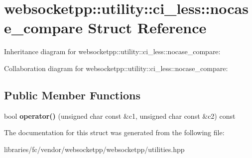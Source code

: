 \hypertarget{structwebsocketpp_1_1utility_1_1ci__less_1_1nocase__compare}{}\section{websocketpp\+:\+:utility\+:\+:ci\+\_\+less\+:\+:nocase\+\_\+compare Struct Reference}
\label{structwebsocketpp_1_1utility_1_1ci__less_1_1nocase__compare}


Inheritance diagram for websocketpp\+:\+:utility\+:\+:ci\+\_\+less\+:\+:nocase\+\_\+compare\+:


Collaboration diagram for websocketpp\+:\+:utility\+:\+:ci\+\_\+less\+:\+:nocase\+\_\+compare\+:
\subsection*{Public Member Functions}
\begin{DoxyCompactItemize}
\item 
\mbox{\label{structwebsocketpp_1_1utility_1_1ci__less_1_1nocase__compare_a789eafdd3632c19b563ffb572eb45adc}} 
bool {\bfseries operator()} (unsigned char const \&c1, unsigned char const \&c2) const
\end{DoxyCompactItemize}


The documentation for this struct was generated from the following file\+:\begin{DoxyCompactItemize}
\item 
libraries/fc/vendor/websocketpp/websocketpp/utilities.\+hpp\end{DoxyCompactItemize}

